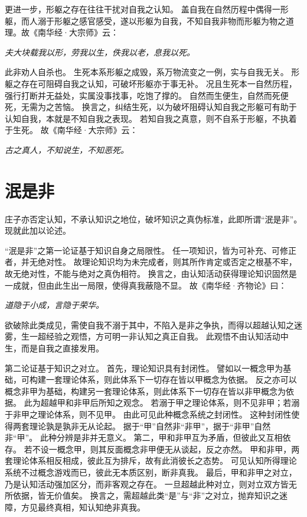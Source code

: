 \documentclass[11pt]{article}
\begin{document}
\newline

更进一步，形躯之存在往往干扰对自我之认知。
盖自我在自然历程中偶得一形躯，而人溺于形躯之感官感受，遂以形躯为自我，不知自我非物而形躯为物之道理。故《南华经·大宗师》云：

\textit{夫大块载我以形，劳我以生，佚我以老，息我以死。}

此非劝人自杀也。
生死本系形躯之成毁，系万物流变之一例，实与自我无关。
形躯之存在可阻碍自我之认知，可破坏形躯亦于事无补。
况且生死本一自然历程，强行打断并无益处，实属没事找事，吃饱了撑的。
自然而生便生，自然而死便死，无需为之苦恼。
换言之，纠结生死，以为破坏阻碍认知自我之形躯可有助于认知自我，本就是不知自我之表现。
若知自我之真意，则不自系于形躯，不执着于生死。
故《南华经·大宗师》云：

\textit{古之真人，不知说生，不知恶死。}

\section{泯是非}
庄子亦否定认知，不承认知识之地位，破坏知识之真伪标准，此即所谓“泯是非”。
现就此加以论述。

\newline

“泯是非”之第一论证基于知识自身之局限性。
任一项知识，皆为可补充、可修正者，并无绝对性。
故理论知识均为未完成者，则其所作肯定或否定之根基不牢，故无绝对性，不能与绝对之真伪相符。
换言之，由认知活动获得理论知识固然是一成就，但由此生出一局限，使得真我蔽隐不显。
故《南华经·齐物论》曰：

\textit{道隐于小成，言隐于荣华。}

欲破除此类成见，需使自我不溺于其中，不陷入是非之争执，而得以超越认知之迷雾，生一超经验之观悟，方可明一非认知之真正自我。
此观悟不由认知活动中生，而是自我之直接发用。


\newline

第二论证基于知识之对立。
首先，理论知识具有封闭性。
譬如以一概念甲为基础，可构建一套理论体系，则此体系下一切存在皆以甲概念为依据。
反之亦可以概念非甲为基础，构建另一套理论体系，则此体系下一切存在皆以非甲概念为依据。
此为超越甲和非甲后所知之观念。
若溺于甲之理论体系，则不见非甲；若溺于非甲之理论体系，则不见甲。
由此可见此种概念系统之封闭性。
这种封闭性使得两套理论孰是孰非无从论起。
据于“甲”自然非“非甲”，据于“非甲”自然非“甲”。
此种分辨是非并无意义。
第二，甲和非甲互为矛盾，但彼此又互相依存。
若不设一概念甲，则其反面概念非甲便无从谈起，反之亦然。
甲和非甲，两套理论体系相反相成，彼此互为排斥，故有此消彼长之态势。
可见认知所得理论系统不过概念游戏而已，彼此无本质区别，断非真我。
最后，甲和非甲之对立，乃是认知活动强加区分，而非客观之存在。
一旦超越此种对立，则对立双方皆无所依据，皆无价值矣。
换言之，需超越此类“是”与“非”之对立，抛弃知识之迷障，方见最终真相，知认知绝非真我。
\end{document}
